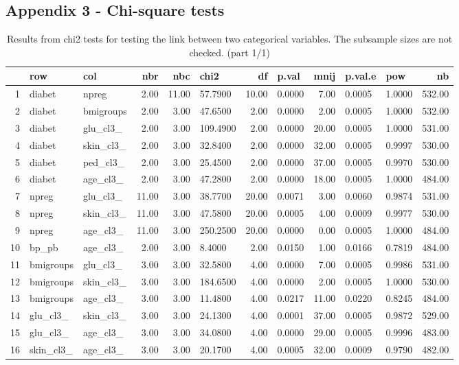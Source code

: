 \documentclass[12pt]{article}
\begin{document}
\begin{landscape}
\section*{Appendix 3 - Chi-square tests}
\begin{table}[ht]
\centering
\begin{tabular}{rllrrlrlrllr}
  \hline
 & row & col & nbr & nbc & chi2 & df & p.val & mnij & p.val.e & pow & nb \\ 
  \hline
1 & diabet & npreg & 2.00 & 11.00 & 57.7900 & 10.00 & 0.0000 & 7.00 & 0.0005 & 1.0000 & 532.00 \\ 
  2 & diabet & bmigroups & 2.00 & 3.00 & 47.6500 & 2.00 & 0.0000 & 2.00 & 0.0005 & 1.0000 & 532.00 \\ 
  3 & diabet & glu\_cl3\_ & 2.00 & 3.00 & 109.4900 & 2.00 & 0.0000 & 20.00 & 0.0005 & 1.0000 & 531.00 \\ 
  4 & diabet & skin\_cl3\_ & 2.00 & 3.00 & 32.8400 & 2.00 & 0.0000 & 32.00 & 0.0005 & 0.9997 & 530.00 \\ 
  5 & diabet & ped\_cl3\_ & 2.00 & 3.00 & 25.4500 & 2.00 & 0.0000 & 37.00 & 0.0005 & 0.9970 & 530.00 \\ 
  6 & diabet & age\_cl3\_ & 2.00 & 3.00 & 47.2800 & 2.00 & 0.0000 & 18.00 & 0.0005 & 1.0000 & 484.00 \\ 
  7 & npreg & glu\_cl3\_ & 11.00 & 3.00 & 38.7700 & 20.00 & 0.0071 & 3.00 & 0.0060 & 0.9874 & 531.00 \\ 
  8 & npreg & skin\_cl3\_ & 11.00 & 3.00 & 47.5800 & 20.00 & 0.0005 & 4.00 & 0.0009 & 0.9977 & 530.00 \\ 
  9 & npreg & age\_cl3\_ & 11.00 & 3.00 & 250.2500 & 20.00 & 0.0000 & 0.00 & 0.0005 & 1.0000 & 484.00 \\ 
  10 & bp\_pb & age\_cl3\_ & 2.00 & 3.00 & 8.4000 & 2.00 & 0.0150 & 1.00 & 0.0166 & 0.7819 & 484.00 \\ 
  11 & bmigroups & glu\_cl3\_ & 3.00 & 3.00 & 32.5800 & 4.00 & 0.0000 & 7.00 & 0.0005 & 0.9986 & 531.00 \\ 
  12 & bmigroups & skin\_cl3\_ & 3.00 & 3.00 & 184.6500 & 4.00 & 0.0000 & 2.00 & 0.0005 & 1.0000 & 530.00 \\ 
  13 & bmigroups & age\_cl3\_ & 3.00 & 3.00 & 11.4800 & 4.00 & 0.0217 & 11.00 & 0.0220 & 0.8245 & 484.00 \\ 
  14 & glu\_cl3\_ & skin\_cl3\_ & 3.00 & 3.00 & 24.1300 & 4.00 & 0.0001 & 37.00 & 0.0005 & 0.9872 & 529.00 \\ 
  15 & glu\_cl3\_ & age\_cl3\_ & 3.00 & 3.00 & 34.0800 & 4.00 & 0.0000 & 29.00 & 0.0005 & 0.9996 & 483.00 \\ 
  16 & skin\_cl3\_ & age\_cl3\_ & 3.00 & 3.00 & 20.1700 & 4.00 & 0.0005 & 32.00 & 0.0009 & 0.9790 & 482.00 \\ 
   \hline
\end{tabular}
\caption{Results from chi2 tests for testing the link between two categorical variables. The subsample sizes are not checked. (part 1/1)} 
\label{tab:chi2.1}
\end{table}
 

\end{landscape}
\end{document}
